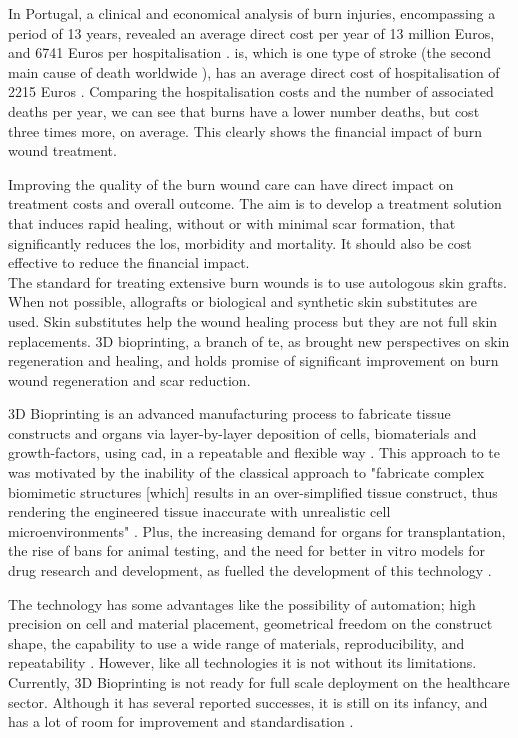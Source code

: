 In Portugal, a clinical and economical analysis of burn injuries, encompassing a period of 13 years, revealed an average direct cost per year of 13 million Euros, and 6741 Euros per hospitalisation \cite{Santos_2016_burden_burns_portugal}. \gls{is}, which is one type of stroke (the second main cause of death worldwide \cite{GHE2016_xls}), has an average direct cost of hospitalisation of 2215 Euros \cite{Santos_2017_atrial_fibrillation_stroke}. Comparing the hospitalisation costs and the number of associated deaths per year, we can see that burns have a lower number deaths, but cost three times more, on average. This clearly shows the financial impact of burn wound treatment.

Improving the quality of the burn wound care can have direct impact on treatment costs and overall outcome. The aim is to develop a treatment solution that induces rapid healing, without or with minimal scar formation, that significantly reduces the \gls{los}, morbidity and mortality. It should also be cost effective to reduce the financial impact. \\

The standard for treating extensive burn wounds is to use autologous skin grafts. When not possible, allografts or biological and synthetic skin substitutes are used. Skin substitutes help the wound healing process but they are not full skin replacements. 3D bioprinting, a branch of \gls{te}, as brought new perspectives on skin regeneration and healing, and holds promise of significant improvement on burn wound regeneration and scar reduction.

3D Bioprinting is an advanced manufacturing process to fabricate tissue constructs and organs via layer-by-layer deposition of cells, biomaterials and growth-factors, using \gls{cad}, in a repeatable and flexible way \cite{Ng2016_skin_bioprint_reality_fantasy}. This approach to \gls{te} was motivated by the inability of the classical approach to "fabricate complex biomimetic structures [which] results in an over-simplified tissue construct, thus rendering the engineered tissue inaccurate with unrealistic cell microenvironments" \cite{Vijayavenkataraman2018_bioprinting_tissues_organs_regen_med}. Plus, the increasing demand for organs for transplantation, the rise of bans for animal testing, and the need for better in vitro models for drug research and development, as fuelled the development of this technology \cite{Vijayavenkataraman2018_bioprinting_tissues_organs_regen_med}.

The technology has some advantages like the possibility of automation; high precision on cell and material placement, geometrical freedom on the construct shape, the capability to use a wide range of materials, reproducibility, and repeatability \cite{Vijayavenkataraman2018_bioprinting_tissues_organs_regen_med}. However, like all technologies it is not without its limitations. Currently, 3D Bioprinting is not ready for full scale deployment on the healthcare sector. Although it has several reported successes, it is still on its infancy, and has a lot of room for improvement and standardisation \cite{Vijayavenkataraman2018_bioprinting_tissues_organs_regen_med, Datta2018_essential_steps_bioprinting}. 

